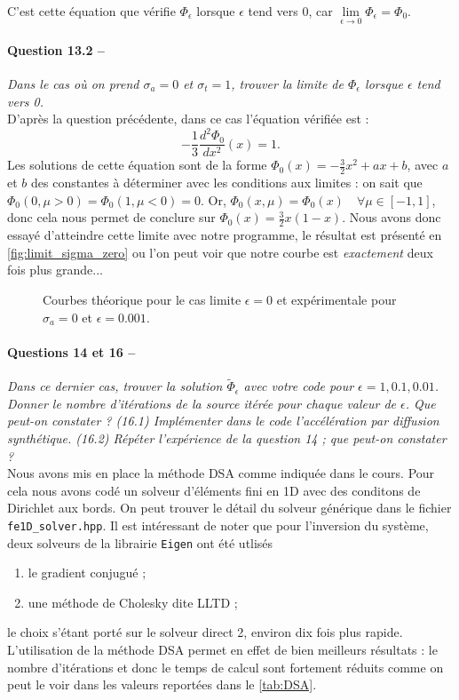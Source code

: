 \documentclass[11pt,a4paper]{article}
\newcommand{\question}[2]{\paragraph{Question #1 --}\hspace{-7pt}\textit{#2} \\}
\newcommand{\questions}[2]{\paragraph{Questions #1 --}\hspace{-7pt}\textit{#2} \\}
\newcommand{\Phit}{\widetilde{\Phi}}
\begin{document}
C'est cette équation que vérifie $\Phi_\epsilon$ lorsque $\epsilon$ tend vers 0, car $\lim\limits_{\epsilon \rightarrow 0} \Phi_\epsilon = \Phi_0$.

\question{13.2}{Dans le cas où on prend $\sigma_a = 0$ et $\sigma_t = 1$, trouver la limite de $\Phi_\epsilon$ lorsque $\epsilon$ tend vers 0.}

D'après la question précédente, dans ce cas l'équation vérifiée est :
\begin{equation}
- \frac{1}{3} \frac{d^2 \Phi_0}{d x^2}(x) = 1 .
\end{equation}
Les solutions de cette équation sont de la forme $\Phi_0(x) = -\frac{3}{2}x^2 + a x +b$, avec $a$ et $b$ des constantes à déterminer avec les conditions aux limites : on sait que $\Phi_0(0,\mu >0) = \Phi_0(1,\mu <0) = 0$.
Or, $\Phi_0(x,\mu) = \Phi_0(x) \quad \forall \mu \in [-1,1]$, donc cela nous permet de conclure sur $\Phi_0(x) = \frac{3}{2}x(1-x)$. Nous avons donc essayé d'atteindre cette limite avec notre programme, le résultat est présenté en \autoref{fig:limit_sigma_zero} ou l'on peut voir que notre courbe est \emph{exactement} deux fois plus grande...

\begin{figure}
  \centering
  
  \caption{Courbes théorique pour le cas limite $\epsilon=0$ et expérimentale pour $\sigma_a=0$ et $\epsilon=0.001$.}
  \label{fig:limit_sigma_zero}
\end{figure}

\questions{14 et 16}{Dans ce dernier cas, trouver la solution $\Phit_\epsilon$ avec votre code pour $\epsilon = 1, 0.1, 0.01$. Donner le nombre d'itérations de la source itérée pour chaque valeur de $\epsilon$. Que peut-on constater ? (16.1) Implémenter dans le code l'accélération par diffusion synthétique. (16.2) Répéter l'expérience de la question 14 ; que peut-on constater ?}

Nous avons mis en place la méthode DSA comme indiquée dans le cours. Pour cela nous avons codé un solveur d'éléments fini en 1D avec des conditons de Dirichlet aux bords. On peut trouver le détail du solveur générique dans le fichier \texttt{fe1D\_solver.hpp}. Il est intéressant de noter que pour l'inversion du système, deux solveurs de la librairie \texttt{Eigen} ont été utlisés
\begin{enumerate}
\item le gradient conjugué ;
\item une méthode de Cholesky dite LLTD ;
\end{enumerate}
le choix s'étant porté sur le solveur direct 2, environ dix fois plus rapide. L'utilisation de la méthode DSA permet en effet de bien meilleurs résultats : le nombre d'itérations et donc le temps de calcul sont fortement réduits comme on peut le voir dans les valeurs reportées dans le \autoref{tab:DSA}. 
\end{document}
